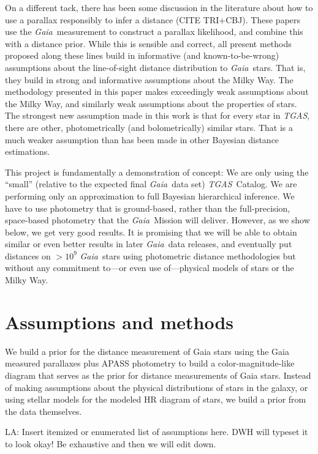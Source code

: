 \documentclass[12pt, preprint]{aastex6}
\newcommand{\acronym}[1]{{\small{#1}}}
\newcommand{\project}[1]{\textsl{#1}}
\newcommand{\tgas}{\project{\acronym{TGAS}}}
\newcommand{\gaia}{\project{Gaia}}
\begin{document}
On a different tack, there has been some discussion in the literature
about how to use a parallax responsibly to infer a distance (CITE TRI+CBJ).
These papers use the \gaia\ measurement to construct a parallax likelihood,
and combine this with a distance prior.
While this is sensible and correct, all present methods proposed along
these lines build in informative (and known-to-be-wrong) assumptions
about the line-of-sight distance distribution to \gaia\ stars.
That is, they build in strong and informative assumptions about the Milky
Way.
The methodology presented in this paper makes exceedingly weak assumptions
about the Milky Way, and similarly weak assumptions about the properties of
stars.
The strongest new assumption made in this work is that for every star
in \tgas, there are other, photometrically (and bolometrically)
similar stars.
That is a much weaker assumption than has been made in other Bayesian
distance estimations.

This project is fundamentally a demonstration of concept:
We are only using the ``small'' (relative to the expected final \gaia\ data set)
\tgas\ Catalog.
We are performing only an approximation to full Bayesian hierarchical inference.
We have to use photometry that is ground-based, rather than the full-precision,
space-based photometry that the \gaia\ Mission will deliver.
However, as we show below, we get very good results.
It is promising that we will be able to obtain similar or even better results
in later \gaia\ data releases, and eventually put distances on $>10^9$
\gaia\ stars using photometric distance methodologies but without any
commitment to---or even use of---physical models of stars or the Milky Way.

\section{Assumptions and methods}

We build a prior for the distance measurement of Gaia stars using the Gaia measured parallaxes plus APASS photometry to build a color-magnitude-like diagram that serves as the prior for distance measurements of Gaia stars. Instead of making assumptions about the physical distributions of stars in the galaxy, or using stellar models for the modeled HR diagram of stars, we build a prior from the data themselves.

LA: Insert itemized or enumerated list of assumptions here. DWH will
typeset it to look okay! Be exhaustive and then we will edit down.
\end{document}
